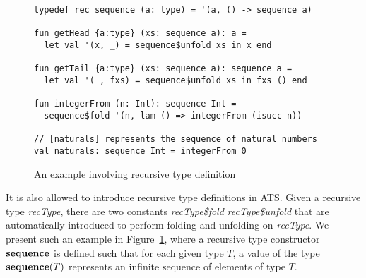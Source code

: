 \def\tsequence{{\bf sequence}}
\begin{figure}
\begin{verbatim}
typedef rec sequence (a: type) = '(a, () -> sequence a)

fun getHead {a:type} (xs: sequence a): a =
  let val '(x, _) = sequence$unfold xs in x end

fun getTail {a:type} (xs: sequence a): sequence a =
  let val '(_, fxs) = sequence$unfold xs in fxs () end

fun integerFrom (n: Int): sequence Int =
  sequence$fold '(n, lam () => integerFrom (isucc n))

// [naturals] represents the sequence of natural numbers
val naturals: sequence Int = integerFrom 0
\end{verbatim}
\caption{An example involving recursive type definition}
\label{figure:rec_type_sequence}
\end{figure}
It is also allowed to introduce recursive type definitions in ATS.  Given a
recursive type {\it recType}, there are two constants {\it recType\$fold}
{\it recType\$unfold} that are automatically introduced to perform folding
and unfolding on {\it recType}. We present such an example in
Figure~\ref{figure:rec_type_sequence}, where a recursive type constructor
$\tsequence$ is defined such that for each given type $T$, a value of the
type $\tsequence(T)$ represents an infinite sequence of elements of type
$T$.

